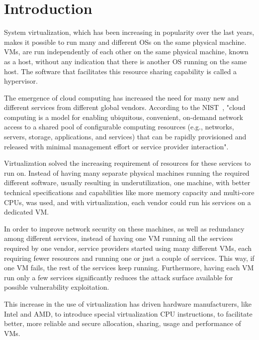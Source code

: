 \chapter{Introduction}\label{ch:intro}

System virtualization, which has been increasing in popularity over the last years, makes it possible to run many and different \acp{OS} on the same physical machine. \acp{VM}, are run independently of each other on the same physical machine, known as a host, without any indication that there is another \ac{OS} running on the same host. The software that facilitates this resource sharing capability is called a hypervisor.

\par The emergence of cloud computing has increased the need for many new and different services from different global vendors. According to the \ac{NIST}~\cite{mell2011nist}, "cloud computing is a model for enabling ubiquitous, convenient, on-demand network access to a shared pool of configurable computing resources (e.g., networks, servers, storage, applications, and services) that can be rapidly provisioned and released with minimal management effort or service provider interaction".  

\par Virtualization solved the increasing requirement of resources for these services to run on. Instead of having many separate physical machines running the required different software, usually resulting in underutilization, one machine, with better technical specifications and capabilities like more memory capacity and multi-core \acp{CPU}, was used, and with virtualization, each vendor could run his services on a dedicated \ac{VM}. 

\par In order to improve network security on these machines, as well as redundancy among different services, instead of having one VM running all the services required by one vendor, service providers started using many different \ac{VM}s, each requiring fewer resources and running one or just a couple of services. This way, if one VM fails, the rest of the services keep running. Furthermore, having each \ac{VM} run only a few services significantly reduces the attack surface available for possible vulnerability exploitation.

\par This increase in the use of virtualization has driven hardware manufacturers, like Intel and AMD, to introduce special virtualization \ac{CPU} instructions, to facilitate better, more reliable and secure allocation, sharing, usage and performance of \ac{VM}s. 

